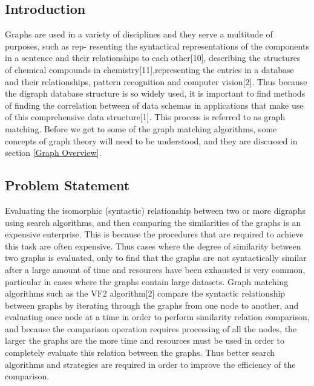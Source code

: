 \label{Introduction}
\subsection{Introduction}
Graphs are used in a variety of disciplines and they serve a multitude of purposes, such as rep-
resenting the syntactical representations of the components in a sentence and their relationships
to each other[10], describing the structures of chemical compounds in chemistry[11],representing
the entries in a database and their relationships, pattern recognition and computer vision[2]. Thus
because the digraph database structure is so widely used, it is important to find methods of finding
the correlation between of data schemas in applications that make use of this comprehensive data
structure[1]. This process is referred to as graph matching. Before we get to some of the graph
matching algorithms, some concepts of graph theory will need to be understood, and they are discussed in section \ref{Graph Overview}.

\subsection{Problem Statement}
Evaluating the isomorphic (syntactic) relationship between two or more digraphs
using search algorithms, and then comparing the similarities of the graphs is an expensive enterprise. 
This is because the procedures that are required to achieve this task are often expensive.
Thus cases where the degree of similarity between two graphs is evaluated,
only to find that the graphs are not syntactically similar after a large amount of time and resources
have been exhausted is very common, particular in cases where the graphs contain large datasets.\newline\newline
Graph matching algorithms such as the VF2 algorithm[2] compare the syntactic relationship between graphs by iterating through the graphs
from one node to another, and evaluating once node at a time in order to perform similarity relation comparison, and because the comparison
operation requires processing of all the nodes, the larger the graphs are the more time and resources must be used in order to completely evaluate this
relation between the graphs. Thus better search algorithms and strategies are required in order to
improve the efficiency of the comparison.

